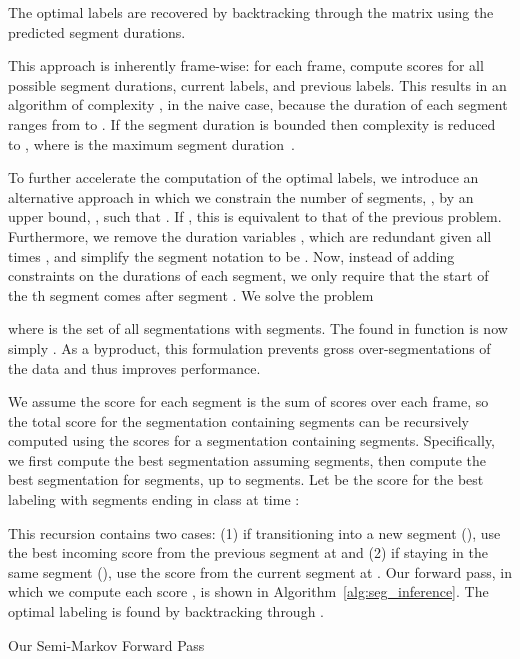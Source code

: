 \documentclass[runningheads]{llncs}
\begin{document}
The optimal labels are recovered by backtracking through the matrix  using the predicted segment durations.

This approach is inherently frame-wise: for each frame, compute scores for all possible segment durations, current labels, and previous labels. 
This results in an algorithm of complexity , in the naive case, because the duration of each segment ranges from  to .
If the segment duration is bounded then complexity is reduced to , where  is the maximum segment duration~\cite{sarawagi_nips_2004,shi_ijcv_2011,pirsiavash_cvpr_2014}. 




To further accelerate the computation of the optimal labels, 
we introduce an alternative approach in which we constrain the number of segments, , by an upper bound, , such that . 
If , this is equivalent to that of the previous problem. 
Furthermore, we remove the duration variables , which are redundant given all times , and simplify the segment notation to be . 
Now, instead of adding constraints on the durations of each segment, we only require that the start of the th segment comes after segment . 
We solve the problem

where  is the set of all segmentations with  segments. 
The  found in function  is now simply . 
As a byproduct, this formulation prevents gross over-segmentations of the data and thus improves performance. 

We assume the score for each segment is the sum of scores over each frame, so the total score for the segmentation containing  segments can be recursively computed using the scores for a segmentation containing  segments. 
Specifically, we first compute the best segmentation assuming  segments, then compute the best segmentation for  segments, up to  segments.
Let  be the score for the best labeling with  segments ending in class  at time :

This recursion contains two cases: (1) if transitioning into a new segment (), use the best incoming score from the previous segment  at  and (2) if staying in the same segment (), use the score from the current segment at . 
Our forward pass, in which we compute each score , is shown in Algorithm~\ref{alg:seg_inference}. The optimal labeling is found by backtracking through . 
\begin{center}
\begin{minipage}[t!]{.7\textwidth}
	\begin{algorithm}[H]
		\begin{algorithmic}[0]
			\For{ } \For{ } \For{ } \State 
			\State 
			\State  
			\EndFor
			\EndFor
			\EndFor
\end{algorithmic}
		\caption{Our Semi-Markov Forward Pass}
		\label{alg:seg_inference}
	\end{algorithm}
\end{minipage}
\end{center}
\end{document}
